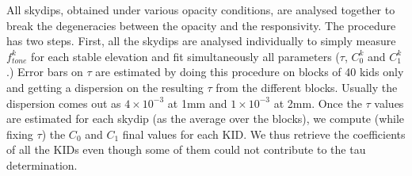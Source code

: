 All skydips, obtained under various opacity
conditions, are analysed together to break the degeneracies between
the opacity and the responsivity. The procedure has two steps.
First, all the skydips are analysed individually to simply measure
$f_{tone}^k$ for each stable elevation and fit simultaneously all 
parameters ($\tau$, $C_0^k$ and $C_1^k$.)
Error bars on $\tau$ are estimated by doing
this procedure on blocks of 40 kids only and getting a dispersion on the
resulting $\tau$ from the different blocks. Usually the dispersion comes out as
$4\times 10^{-3}$ at 1mm and $1\times 10^{-3}$ at 2mm. Once the $\tau$ values
are estimated for each skydip (as the average over the blocks), we compute
(while fixing $\tau$) the $C_0$ and $C_1$ final values for each KID. We thus
retrieve the coefficients of all the KIDs even though some of them could not
contribute to the tau determination.


